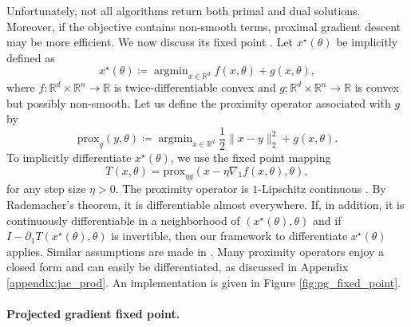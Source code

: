 \documentclass{article}
\def\RR{{\mathbb R}}
\def\prox{{\text{prox}}}
\DeclareMathOperator*{\argmin}{argmin}
\begin{document}
Unfortunately, not all algorithms return both primal and dual solutions. 
Moreover, if the objective contains non-smooth terms,
proximal gradient descent may be more efficient.
We now discuss its fixed point \cite{niculae_2017, bertrand_2020_implicit,
bertrand_2021_journal}.
Let $x^\star(\theta)$ be implicitly defined as
\begin{equation}
x^\star(\theta) \coloneqq \argmin_{x \in \RR^d} f(x, \theta) + g(x, \theta),
\label{eq:composite_pb}
\end{equation}
where $f \colon \RR^d \times \RR^n \to \RR$ is twice-differentiable convex
and $g \colon \RR^d \times \RR^n \to \RR$ is convex but possibly non-smooth.
Let us define the proximity operator associated with $g$ by
\begin{equation}
\prox_g(y, \theta) \coloneqq 
\argmin_{x \in \RR^d} \frac{1}{2} \|x - y\|^2_2 + g(x, \theta).
\end{equation}
To implicitly differentiate $x^\star(\theta)$, we use the fixed point
mapping \cite[p.150]{parikh_2014}
\begin{equation}
T(x, \theta) = \prox_{\eta g}(x - \eta \nabla_1 f(x, \theta), \theta),
\label{eq:proximal_grad_fp}
\end{equation}
for any step size $\eta > 0$.
The proximity operator is
$1$-Lipschitz continuous \cite{Moreau1965Proximite}. By Rademacher's theorem, it
is differentiable almost
everywhere. If, in addition, it is continuously differentiable in a
neighborhood of $(x^\star(\theta),\theta)$ and if $I - \partial_1
T(x^\star(\theta),\theta)$ is invertible, then our framework to differentiate
$x^\star(\theta)$ applies. Similar assumptions are made in
\cite{bertrand_2021_journal}.
Many proximity operators enjoy a closed form and can
easily be
differentiated, as discussed in Appendix \ref{appendix:jac_prod}.
An implementation is given in Figure \ref{fig:pg_fixed_point}.

\paragraph{Projected gradient fixed point.} 
\end{document}
